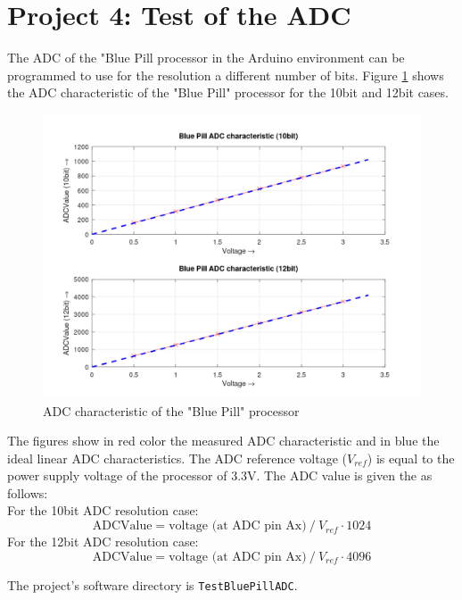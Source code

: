 \documentclass[11pt, oneside]{scrartcl}   	%
\begin{document}
\section{Project 4: Test of the ADC}
The ADC of the "Blue Pill processor in the Arduino environment can be programmed to use for the resolution a different number of bits. 
Figure \ref{fig:BluePillADC} shows the ADC characteristic of the "Blue Pill" processor for the 10bit and 12bit cases.
\begin{figure}[htbp]
	\centering
	\includegraphics[width=0.9\linewidth]{Figures/BluePillADCCharacteristic.png}
	\caption{ADC characteristic of the "Blue Pill" processor}
	\label{fig:BluePillADC}
\end{figure}
The figures show in red color the measured ADC characteristic and in blue the ideal linear ADC characteristics.
The ADC reference voltage ($V_{ref}$) is equal to the power supply voltage of the processor of 3.3V.
The ADC value is given the as follows:\\
For the 10bit ADC resolution case:
\begin{equation*}
 \text{ADCValue} = \text{voltage (at ADC pin Ax)} ~/~ V_{ref} \cdot 1024
\end{equation*}
For the 12bit ADC resolution case:
\begin{equation*}
\text{ADCValue} = \text{voltage (at ADC pin Ax)} ~/~ V_{ref} \cdot 4096
\end{equation*}

The project's software directory is \verb!TestBluePillADC!.
\end{document}
